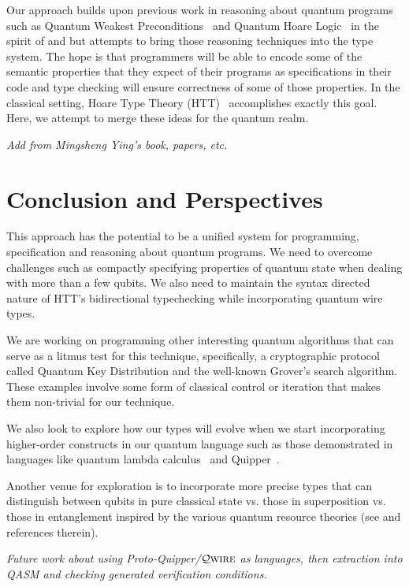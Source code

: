 \documentclass[acmsmall,nonacm,timestamp]{acmart}
\newcommand{\qwire}{\ensuremath{\mathcal{Q}\textsc{wire}}\xspace}
\begin{document}
Our approach builds upon previous work in reasoning about quantum programs such as Quantum Weakest Preconditions~\cite{dhondt_quantum_2006} and Quantum Hoare Logic~\cite{ying_floydhoare_2012} in the spirit of \citet{hoare_axiomatic_1969} and \citet{dijkstra_discipline_1976} but attempts to bring those reasoning techniques into the type system. The hope is that programmers will be able to encode some of the semantic properties that they expect of their programs as specifications in their code and type checking will ensure correctness of some of those properties. In the classical setting, Hoare Type Theory (HTT)~\cite{nanevski_hoare_2008} accomplishes exactly this goal. Here, we attempt to merge these ideas for the quantum realm.

\textit{Add from Mingsheng Ying's book, papers, etc.}

\section{Conclusion and Perspectives}
This approach has the potential to be a unified system for programming, specification and reasoning about quantum programs. We need to overcome challenges such as compactly specifying properties of quantum state when dealing with more than a few qubits. We also need to maintain the syntax directed nature of HTT's bidirectional typechecking while incorporating quantum wire types.

We are working on programming other interesting quantum algorithms that can serve as a litmus test for this technique, specifically, a cryptographic protocol called Quantum Key Distribution and the well-known Grover's search algorithm. These examples involve some form of classical control or iteration that makes them non-trivial for our technique.

We also look to explore how our types will evolve when we start incorporating higher-order constructs in our quantum language such as those demonstrated in languages like quantum lambda calculus~\cite{selinger_lambda_2006} and Quipper~\cite{green_quipper:_2013}.

Another venue for exploration is to incorporate more precise types that can distinguish between qubits in pure classical state vs. those in superposition vs. those in entanglement inspired by the various quantum resource theories (see \cite{rand_type_2019} and references therein).

\textit{Future work about using Proto-Quipper/\qwire as languages, then extraction into QASM and checking generated verification conditions.}
\end{document}
